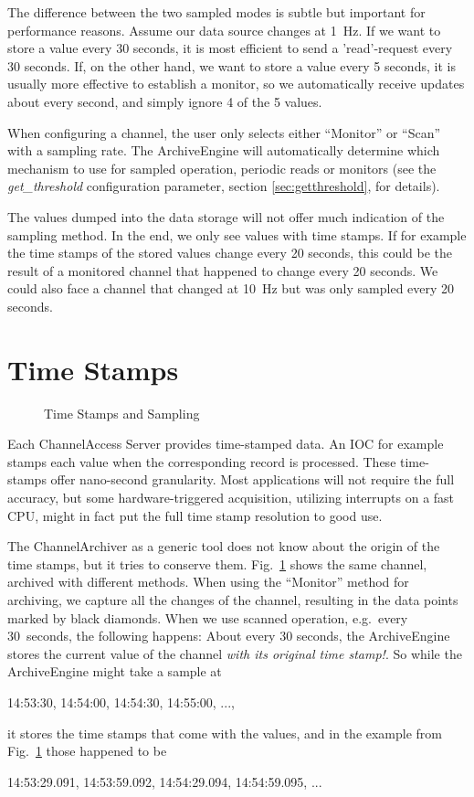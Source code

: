 \noindent The difference between the two sampled modes is subtle but important
for performance reasons. Assume our data source changes at 1~Hz. If
we want to store a value every 30 seconds, it is most efficient to
send a 'read'-request every 30 seconds. If, on the other hand, we want
to store a value every 5 seconds, it is usually more effective to
establish a monitor, so we automatically receive updates about every
second, and simply ignore 4 of the 5 values.

When configuring a channel, the user only selects either ``Monitor''
or ``Scan'' with a sampling rate.  The ArchiveEngine will
automatically determine which mechanism to use for sampled operation,
periodic reads or monitors (see the \emph{get\_threshold} configuration
parameter, section \ref{sec:getthreshold}, for details).

\NOTE The values dumped into the data storage will not offer much
indication of the sampling method. In the end, we only see values with
time stamps. If for example the time stamps of the stored values
change every 20 seconds, this could be the result of a monitored
channel that happened to change every 20 seconds. We could also face a
channel that changed at 10~Hz but was only sampled every 20 seconds. 

\section{Time Stamps}
\begin{figure}[htb]
\begin{center}
\end{center}
\caption{\label{fig:times}Time Stamps and Sampling}
\end{figure}

\noindent Each ChannelAccess Server provides time-stamped data. An IOC for
example stamps each value when the corresponding record is
processed.  These time-stamps offer nano-second granularity. Most
applications will not require the full accuracy, but some
hardware-triggered acquisition, utilizing interrupts on a fast CPU,
might in fact put the full time stamp resolution to good use.

The ChannelArchiver as a generic tool does not know about the origin
of the time stamps, but it tries to conserve them.
Fig.~\ref{fig:times} shows the same channel, archived with different methods.
When using the ``Monitor'' method for archiving, we capture all the
changes of the channel, resulting in the data points marked by black
diamonds.
When we use scanned operation, e.g.\ every 30~seconds, the following
happens: About every 30 seconds, the ArchiveEngine stores the current
value of the channel \emph{with its original time stamp!}.
So while the ArchiveEngine might take a sample at
\begin{center}
14:53:30, 14:54:00, 14:54:30, 14:55:00, ...,
\end{center}
it stores the time stamps that come with the values, and in the
example from Fig.~\ref{fig:times} those happened to be
\begin{center}
14:53:29.091,  14:53:59.092, 14:54:29.094,  14:54:59.095, ...
\end{center}

